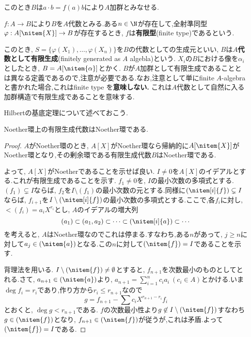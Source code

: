 このとき$B$は$a\cdot b=f(a)b$により$A$加群とみなせる.

\begin{defi}[有限型]
	$f:A\to B$により$B$を$A$代数とみる.ある$n\in\N$が存在して,全射準同型$\varphi:A[\nitem{X}]\to B$が存在するとき, $f$は\textbf{有限型}(finite type)であるという.
\end{defi}

このとき, $S=\{\varphi(X_1),\dots,\varphi(X_n)\}$を$B$の代数としての生成元といい, $B$は$A$\textbf{代数として有限生成}(finitely generated as $A$ algebla)という. $X_i$の$B$における像を$\alpha_i$としたとき, $B=A[\nitem{\alpha}]$とかく. $B$が$A$加群として有限生成であることとは異なる定義であるので,注意が必要である.なお,注意として単にfinite $A$-algebraと書かれた場合,これはfinite type を\textbf{意味しない.} これは$A$代数として自然に入る加群構造で有限生成であることを意味する. 

Hilbertの基底定理について述べておこう.
\begin{thm}[Hilbertの基底定理]\label{thm:Hilbertの基底定理}
		Noether環上の有限生成代数はNoether環である.
	\end{thm}
	\begin{proof}
		$A$がNoether環のとき, $A[X]$がNoether環なら帰納的に$A[\nitem{X}]$がNoether環となり,その剰余環である有限生成代数$B$はNoether環である.
		
		よって, $A[X]$がNoetherであることを示せば良い. $I\neq0$を$A[X]$のイデアルとする.これが有限生成であることを示す. $f_1\neq0$を, $I$の最小次数の多項式とする. $(f_1)\subsetneq I$ならば, $f_2$を$I\setminus(f_1)$の最小次数の元とする.同様に$(\nitem[i]{f})\subsetneq I$ならば, $f_{i+1}$を$I\setminus(\nitem[i]{f})$の最小次数の多項式とする.ここで,各$f_i$に対し, $\lt(f_i)=a_iX^{r_i}$とし, $A$のイデアルの増大列
		\[(a_1)\subset(a_1,a_2)\subset\dots\subset(\nitem[i]{a})\subset\cdots\]
		を考えると, $A$はNoether環なのでこれは停まる.すなわち,ある$n$があって, $j\geq n$に対して$a_j\in(\nitem{a})$となる.この$n$に対して$(\nitem{f})=I$であることを示す.
		
		背理法を用いる. $I\setminus(\nitem{f})\neq\emptyset$とすると, $f_{n+1}$を次数最小のものとしてとれる.さて, $a_{n+1}\in(\nitem{a})$より, $a_{n+1}=\sum_{i=1}^n c_ia_i~(c_i\in A)$とかける.いま$\deg{f_i}=r_i$であり,作り方から$r_i\leq r_{n+1}$なので
		\[g=f_{n+1}-\sum c_iX^{r_{n+1}-r_i}f_i\]
		とおくと, $\deg g<r_{n+1}$である. $f$の次数最小性より$g\not\in I\setminus(\nitem{f})$すなわち$g\in(\nitem{f})$となり, $f_{n+1}\in(\nitem{f})$が従うが,これは矛盾.よって$(\nitem{f})=I$である.
\end{proof}


